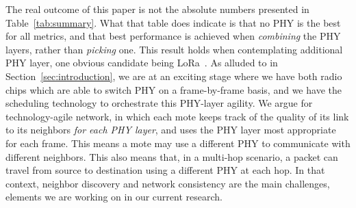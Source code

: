 \documentclass[sensors,article,submit,moreauthors,pdftex]{Definitions/mdpi}
\begin{document}

The real outcome of this paper is not the absolute numbers presented in Table~\ref{tab:summary}.
What that table does indicate is that no PHY is the best for all metrics,
    and that best performance is achieved when \textit{combining} the PHY layers, rather than \textit{picking} one.
This result holds when contemplating additional PHY layer,
    one obvious candidate being LoRa~\cite{adelantado17understanding}.
As alluded to in Section~\ref{sec:introduction}, we are at an exciting stage where we have both radio chips which are able to switch PHY on a frame-by-frame basis, and we have the scheduling technology to orchestrate this PHY-layer agility.
We argue for technology-agile network, in which each mote keeps track of the quality of its link to its neighbors \textit{for each PHY layer}, and uses the PHY layer most appropriate for each frame.
This means a mote may use a different PHY to communicate with different neighbors.
This also means that, in a multi-hop scenario, a packet can travel from source to destination using a different PHY at each hop.
In that context, neighbor discovery and network consistency are the main challenges, elements we are working on in our current research.



\end{document}

